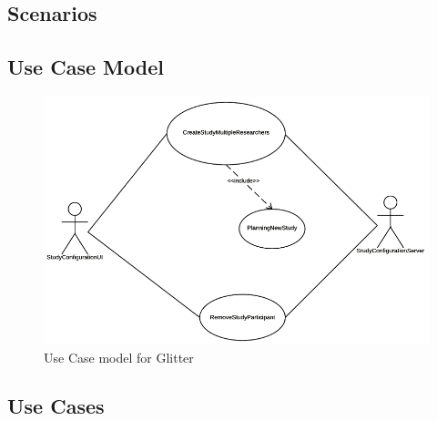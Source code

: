 
\subsection{Scenarios}

\pagebreak


\subsection{Use Case Model}
\begin{figure}[!h]
    \centering
    \includegraphics[width=.95\textwidth]{./uml/use_case_model.png}
    \caption{Use Case model for Glitter}
    \label{fig:CreateStudy}
\end{figure}

\subsection{Use Cases}


